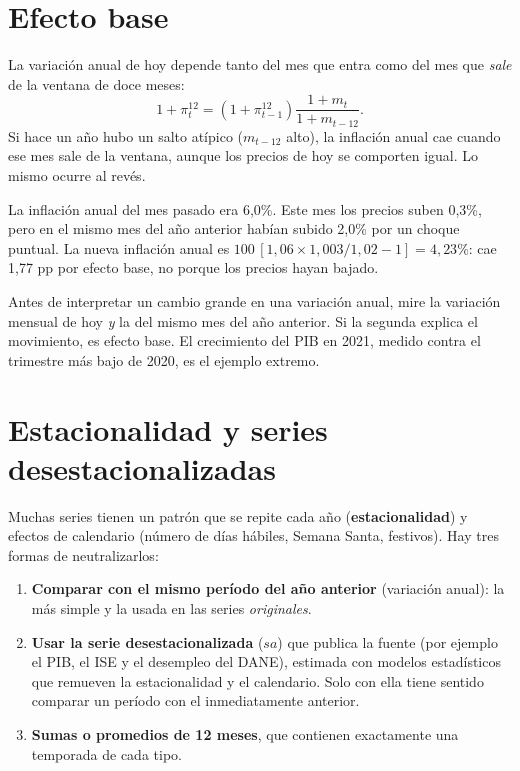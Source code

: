 \section{Efecto base}
\label{es:f:base}
La variación anual de hoy depende tanto del mes que entra como del mes que \emph{sale} de la ventana de doce
meses:
\[
1+\pi^{12}_t=\left(1+\pi^{12}_{t-1}\right)\frac{1+m_t}{1+m_{t-12}}.
\]
Si hace un año hubo un salto atípico ($m_{t-12}$ alto), la inflación anual cae cuando ese mes sale de la ventana,
aunque los precios de hoy se comporten igual. Lo mismo ocurre al revés.

\begin{dato}
La inflación anual del mes pasado era 6,0\%. Este mes los precios suben 0,3\%, pero en el mismo mes del año
anterior habían subido 2,0\% por un choque puntual. La nueva inflación anual es
$100\,[1{,}06\times1{,}003/1{,}02-1]=4{,}23\%$: cae 1,77 pp por efecto base, no porque los precios hayan
bajado.
\end{dato}

\begin{leer}
Antes de interpretar un cambio grande en una variación anual, mire la variación mensual de hoy \emph{y} la del
mismo mes del año anterior. Si la segunda explica el movimiento, es efecto base. El crecimiento del PIB en 2021,
medido contra el trimestre más bajo de 2020, es el ejemplo extremo.
\end{leer}

\section{Estacionalidad y series desestacionalizadas}
\label{es:f:estacional}
Muchas series tienen un patrón que se repite cada año (\textbf{estacionalidad}) y efectos de calendario (número
de días hábiles, Semana Santa, festivos). Hay tres formas de neutralizarlos:
\begin{enumerate}
\item \textbf{Comparar con el mismo período del año anterior} (variación anual): la más simple y la usada en las
  series \emph{originales}.
\item \textbf{Usar la serie desestacionalizada} ($sa$) que publica la fuente (por ejemplo el PIB, el ISE y el
  desempleo del DANE), estimada con modelos estadísticos que remueven la estacionalidad y el calendario. Solo
  con ella tiene sentido comparar un período con el inmediatamente anterior.
\item \textbf{Sumas o promedios de 12 meses}, que contienen exactamente una temporada de cada tipo.
\end{enumerate}

